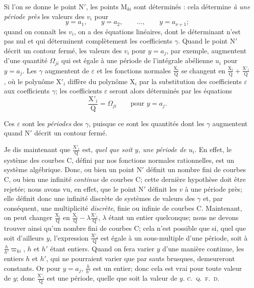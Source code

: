 \documentclass{article}
\begin{document}
Si l'on se donne le point $\mathrm{N}'$, les points $\mathrm{M}_{ki}$ sont déterminés : cela détermine \emph{à une période près} les valeurs des $v_{i}$ pour
\[
y = a_{1}, \qquad y = a_{2}, \qquad \dots, \qquad y = a_{\nu+1};
\]
quand on connaît les $v_{i}$, on a des équations linéaires, dont le déterminant n'est pas nul et qui déterminent complètement les coefficients $\gamma$. Quand le point $\mathrm{N}'$ décrit un contour fermé, les valeurs des $v_{i}$ pour $y = a_{j}$, par exemple, augmentent d'une quantité $\Omega_{ji}$ qui est égale à une période de l'intégrale abélienne $u_{i}$ pour $y = a_{j}$. Les $\gamma$ augmentent de $\varepsilon$ et les fonctions normales $\frac{\mathrm{X}_{i}}{\mathrm{Q}}$ se changent en $\frac{\mathrm{X}_{i}}{\mathrm{Q}} + \frac{\mathrm{X}'_{i}}{\mathrm{Q}}$, où le polynôme $\mathrm{X}'_{i}$ diffère du polynôme $\mathrm{X}_{i}$ par la substitution des coefficients $\varepsilon$ aux coefficients $\gamma$; les coefficients $\varepsilon$ seront alors déterminés par les équations
\[
\frac{\mathrm{X}'_{i}}{\mathrm{Q}} = \Omega_{ji} \qquad \text{pour } y = a_{j}.
\]

Ces $\varepsilon$ sont les \emph{périodes} des $\gamma$, puisque ce sont les quantités dont les $\gamma$ augmentent quand $\mathrm{N}'$ décrit un contour fermé.

Je dis maintenant que $\frac{\mathrm{X}'_{i}}{\mathrm{Q}}$ est, \emph{quel que soit $y$, une période de $u_{i}$}. En effet, le système des courbes $\mathrm{C}$, défini par nos fonctions normales rationnelles, est un système algébrique. Donc, ou bien un point $\mathrm{N}'$ définit un nombre fini de
courbes $\mathrm{C}$, ou bien une infinité \emph{continue} de courbes $\mathrm{C}$; cette dernière hypothèse doit être rejetée; nous avons vu, en effet, que le point $\mathrm{N}'$ définit les $v$ à une période près; elle définit donc une infinité discrète de systèmes de valeurs des $\gamma$ et, par conséquent, une multiplicité \emph{discrète}, finie ou infinie de courbes $\mathrm{C}$. Maintenant, on peut changer $\frac{\mathrm{X}_{i}}{\mathrm{Q}}$ en $\frac{\mathrm{X}_{i}}{\mathrm{Q}} - \lambda \frac{\mathrm{X}'_{i}}{\mathrm{Q}}$, $\lambda$ étant un entier quelconque; nous ne devons trouver ainsi qu'un nombre fini de courbes $\mathrm{C}$; cela n'est possible que si, quel que soit d'ailleurs $y$, l'expression $\frac{\mathrm{X}'_{i}}{\mathrm{Q}}$ est égale à un sous-multiple d'une période, soit à $\frac{h}{h'}\varpi_{ki}$, $h$ et $h'$ étant entiers. Quand on fera varier $y$ d'une manière continue, les entiers $h$ et $h'$, qui ne pourraient varier que par sauts brusques, demeureront constants. Or pour $y = a_{j}$, $\frac{h}{h'}$ est un entier; donc cela est vrai pour toute valeur de $y$; donc $\frac{\mathrm{X}'_{i}}{\mathrm{Q}}$ est une période, quelle que soit la valeur de $y$. \hfill \textsc{c.~q.~f.~d.}
\end{document}
